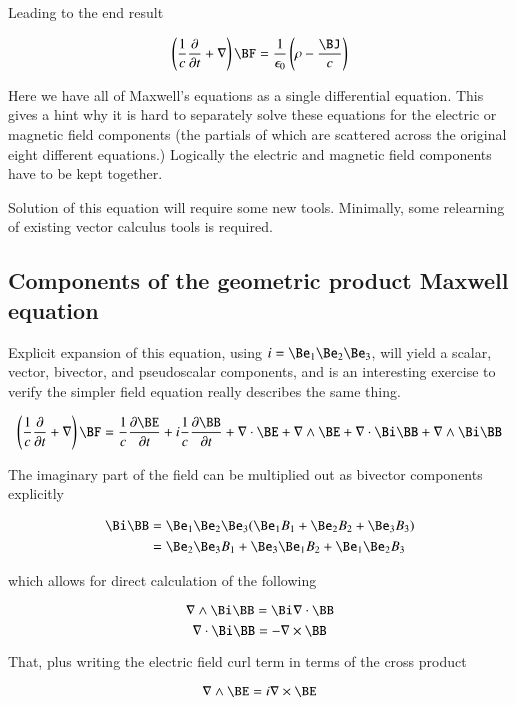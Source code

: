 Leading to the end result

\begin{equation}\label{eqn:maxwells_ga:maxwells}
\left(\frac{1}{c} \frac{\partial}{\partial t} + \nabla\right)\BF = \frac {1} {\epsilon_0}\left(\rho - \frac{\BJ}{c}\right)
\end{equation}

Here we have all of Maxwell's equations as a single differential equation.
This gives a hint why it is hard to separately solve these equations for the electric or magnetic field components (the partials of which are scattered across the original eight different equations.)  Logically the electric and magnetic field components have to be kept together.

Solution of this equation will require some new tools.  Minimally, some relearning of existing vector calculus tools is required.

\subsection{Components of the geometric product Maxwell equation }

Explicit expansion of this equation, using $i={\Be}_1{\Be}_2{\Be}_3$, will yield a scalar, vector, bivector, and pseudoscalar components, and is an interesting exercise to verify the simpler field equation really describes the same thing.

\[
\left(\frac{1}{c} \frac{\partial}{\partial t} + \nabla\right)\BF
= \frac{1}{c} \frac{\partial \BE}{\partial t} + i\frac{1}{c} \frac{\partial \BB}{\partial t}
+ \nabla \cdot \BE + \nabla \wedge \BE + \nabla \cdot \Bi \BB + \nabla \wedge \Bi \BB
\]

The imaginary part of the field can be multiplied out as bivector components explicitly

\begin{align*}
\Bi \BB &= \Be _1 \Be _2 \Be _3 ( \Be _1 B_1 + \Be _2 B_2 + \Be _3 B_3 ) \\
&= \Be _2 \Be _3 B_1 + \Be _3 \Be _1 B_2 + \Be _1 \Be _2 B_3
\end{align*}

which allows for direct calculation of the following

\[
\nabla \wedge \Bi\BB = \Bi\nabla \cdot \BB
\]
\[
\nabla \cdot \Bi\BB = -\nabla \times \BB
\]

That, plus writing the electric field curl term in terms of the cross product

\[
\nabla \wedge \BE = i \nabla \times \BE
\]

